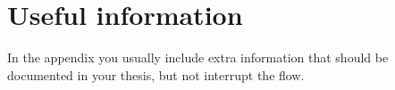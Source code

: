 \chapter{Useful information}
\label{sec:app}

In the appendix you usually include extra information that should be
documented in your thesis, but not interrupt the flow.

